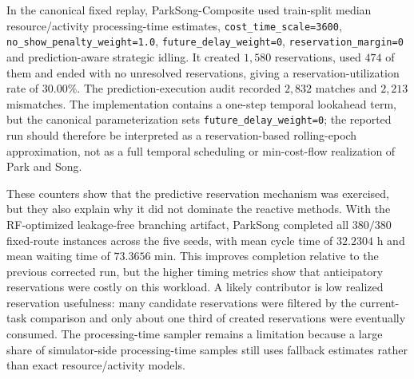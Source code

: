 In the canonical fixed replay, ParkSong-Composite used train-split median
resource/activity processing-time estimates, \texttt{cost\_time\_scale=3600},
\texttt{no\_show\_penalty\_weight=1.0}, \texttt{future\_delay\_weight=0},
\texttt{reservation\_margin=0} and prediction-aware strategic idling. It
created $1{,}580$ reservations, used $474$ of them and ended with no unresolved
reservations, giving a reservation-utilization rate of $30.00\%$. The
prediction-execution audit recorded $2{,}832$ matches and $2{,}213$ mismatches.
The implementation contains a one-step temporal lookahead term, but the
canonical parameterization sets \texttt{future\_delay\_weight=0}; the reported
run should therefore be interpreted as a reservation-based rolling-epoch
approximation, not as a full temporal scheduling or min-cost-flow realization of
Park and Song.

These counters show that the predictive reservation mechanism was exercised, but
they also explain why it did not dominate the reactive methods. With the
RF-optimized leakage-free branching artifact, ParkSong completed all $380/380$
fixed-route instances across the five seeds, with mean cycle time of $32.2304$ h
and mean waiting time of $73.3656$ min. This improves completion relative to the
previous corrected run, but the higher timing metrics show that anticipatory
reservations were costly on this workload. A likely contributor is low realized
reservation usefulness: many candidate reservations were filtered by the
current-task comparison and only about one third of created reservations were
eventually consumed. The processing-time sampler remains a limitation because a
large share of simulator-side processing-time samples still uses fallback
estimates rather than exact resource/activity models.

